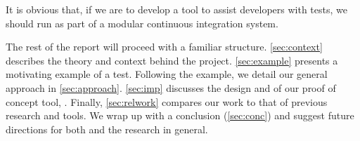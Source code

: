 It is obvious that, if we are to develop a tool to assist developers with \flaky
tests, we should run as part of a modular continuous integration system.

The rest of the report will proceed with a familiar structure.
\autoref{sec:context} describes the theory and context behind the project.
\autoref{sec:example} presents a motivating example of a \flaky test. Following
the example, we detail our general approach in \autoref{sec:approach}.
\autoref{sec:imp} discusses the design and of our proof of concept tool,
\splatter. Finally, \autoref{sec:relwork} compares our work to that of previous
research and tools. We wrap up with a conclusion (\autoref{sec:conc}) and
suggest future directions for both \splatter and the research in general.
